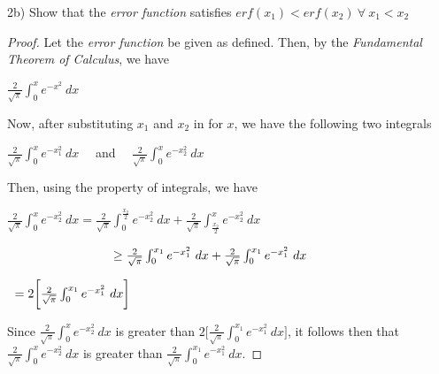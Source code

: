 \documentclass[12pt, executivepaper]{article}
\begin{document}
\begin{flushleft}

2b) Show that the \textit{error function} satisfies $erf(x_{1}) < erf(x_{2}) {~} \forall {~} x_{1} < x_{2}$

\begin{proof}

Let the \textit{error function} be given as defined. Then, by the \textit{Fundamental Theorem of Calculus}, we have

\begin{center}

$\frac{2}{\sqrt{\pi}} \int_{0}^{x} e^{-x^{2}} \ dx$

\end{center}

Now, after substituting $x_{1}$ and $x_{2}$ in for $x$, we have the following two integrals

\begin{center}

$\frac{2}{\sqrt{\pi}} \int_{0}^{x} e^{-x_{1}^{2}} \ dx \quad$ and $\quad \frac{2}{\sqrt{\pi}} \int_{0}^{x} e^{-x_{2}^{2}} \ dx$

\end{center}

Then, using the property of integrals, we have

\begin{center}

$\frac{2}{\sqrt{\pi}} \int_{0}^{x} e^{-x_{2}^{2}} \ dx=\frac{2}{\sqrt{\pi}} \int_{0}^{\frac{x_{2}}{2}} e^{-x_{2}^{2}} \ dx + \frac{2}{\sqrt{\pi}} \int_{\frac{x_{2}}{2}}^{x} e^{-x_{2}^{2}} \ dx$

\vspace{2mm}

$\hspace{30mm} \geq \frac{2}{\sqrt{\pi}} \int_{0}^{x_{1}} e^{-x_{1}^{2}} \ dx + \frac{2}{\sqrt{\pi}} \int_{0}^{x_{1}} e^{-x_{1}^{2}} \ dx$

\vspace{2mm}

$\hspace{2mm} =2\bigg[\frac{2}{\sqrt{\pi}} \int_{0}^{x_{1}} e^{-x_{1}^{2}} \ dx\bigg]$                                           

\end{center}

Since $\frac{2}{\sqrt{\pi}} \int_{0}^{x} e^{-x_{2}^{2}} \ dx$ is greater than $2\bigg[\frac{2}{\sqrt{\pi}} \int_{0}^{x_{1}} e^{-x_{1}^{2}} \ dx\bigg]$, it follows then that $\frac{2}{\sqrt{\pi}} \int_{0}^{x} e^{-x_{2}^{2}} \ dx$ is greater than $\frac{2}{\sqrt{\pi}} \int_{0}^{x_{1}} e^{-x_{1}^{2}} \ dx$.

\end{proof}

\end{flushleft}
\end{document}
